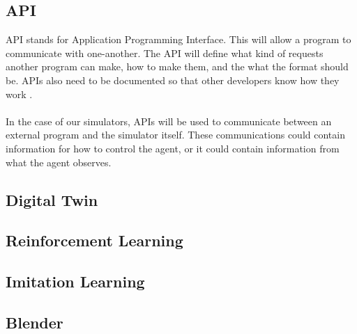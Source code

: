\subsection{API}
API stands for Application Programming Interface. This will allow a program to communicate with one-another. The API will define what kind of requests another program can make, how to make them, and the what the format should be. APIs also need to be documented so that other developers know how they work \cite{WulfJochen2020FVCw}.
\\~\\
In the case of our simulators, APIs will be used to communicate between an external program and the simulator itself. These communications could contain information for how to control the agent, or it could contain information from what the agent observes. 

\subsection{Digital Twin}

\subsection{Reinforcement Learning}

\subsection{Imitation Learning}

\subsection{Blender}
